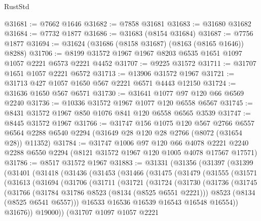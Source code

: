 \begin{lexlean}{RustStd}
\begin{coremodule}
{\begin{coremodule}
{{{{{{{{{{{{{{{{{{{{{{{{{{{{{{{{{{{{{{{{{{{{{{{{{{{{{@31681 := @7662 @1646
@31682 := @7858 @31681
@31683 := @31680 @31682
@31684 := @7732 @1877
@31686 := @31683 (@8154 @31684)
@31687 := @7756 @1877
@31694 := @31624 (@31686 (@8158 @31687) (@8163 (@8165 @1646)) @8288)
@31706 := @8199 @31572 @1967 @1967 @8203 @6535 @1651 @1097 @1057 @2221 @6573 @2221 @4452
@31707 := @9225 @31572
@31711 := @31707 @1651 @1057 @2221 @6572
@31713 := @13906 @31572 @1967
@31721 := @31713 @427 @1057 @1650 @567 @2221 @6571 @4443 @12150
@31724 := @31636 @1650 @567 @6571
@31730 := @31641 @1077 @97 @120 @66 @6569 @2240
@31736 := @10336 @31572 @1967 @1077 @120 @6558 @6567
@31745 := @8431 @31572 @1967 @850 @1076 @841 @120 @6558 @6565 @3539
@31747 := @8445 @31572 @1967
@31766 := @31747
    @156
    @1075
    @120
    @567
    @2766
    @6557
    @6564
    @2288
    @6540
    @2294
    (@31649 @28 @120 @28 @2766 (@8072 (@31654 @28)) @11352)
@31784 := @31747
    @1006
    @97
    @120
    @66
    @4078
    @2221
    @2240
    @2288
    @6550
    @2294
    (@8121 @31572 @1967 @120 @1005 @4078 @17567 @17571)
@31786 := @8517 @31572 @1967
@31883 := @31331
    (@31356
      (@31397
        (@31399
          (@31401
            (@31418
              (@31436
                (@31453
                  (@31466
                    (@31475
                      (@31479
                        (@31555
                          (@31571
                            (@31613
                              (@31694
                                (@31706
                                  (@31711
                                    (@31721
                                      (@31724
                                        (@31730
                                          (@31736
                                            (@31745
                                              (@31766
                                                (@31784 @31786 @8523 (@8134 (@8525 @6551 @2221)))
                                                @8523
                                                (@8134 (@8525 @6541 @6557)))
                                              @16533
                                              @16536
                                              @16539
                                              @16543
                                              @16548
                                              @16554))
                                          @31676))
                                      @19000))
                                  (@31707
                                    @1097
                                    @1057
                                    @2221
}}}}}}}}}}}}}}}}}}}}}}}}}}}}}}}}}}}}}}}}}}}}}}}}}}}}}
\end{coremodule}}
\end{coremodule}
\end{lexlean}
